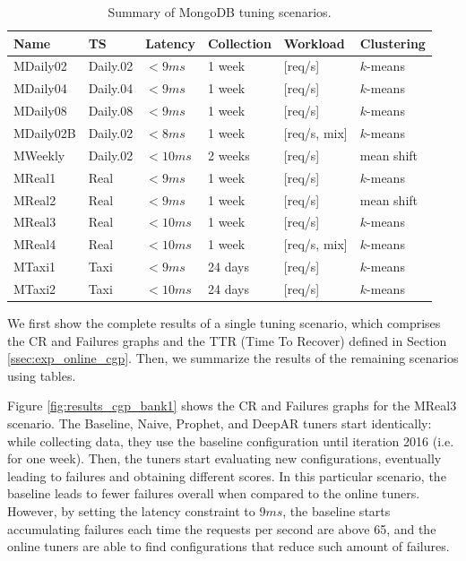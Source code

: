 \documentclass[a4paper, 12pt]{article} %
\newcommand{\ra}[1]{\renewcommand{\arraystretch}{#1}}
\begin{document}
	\begin{table}\centering 
		\ra{1.3}
		\begin{tabularx}{\textwidth}{@{}llllXX@{}}
			\midrule
			Name & TS & Latency & Collection & Workload & Clustering\\
			\midrule
			MDaily02&Daily.02 & $<9ms$  & 1 week & [req/s]  & $k$-means\\
			MDaily04&Daily.04 & $<9ms$  & 1 week & [req/s]  & $k$-means\\
			MDaily08&Daily.08 & $<9ms$  & 1 week & [req/s] & $k$-means\\
			MDaily02B&Daily.02 & $<8ms$  & 1 week & [req/s, mix] & $k$-means\\
			MWeekly&Daily.02 & $<10ms$  & 2 weeks & [req/s]  & mean shift\\
			MReal1&Real & $<9ms$  & 1 week & [req/s]  & $k$-means\\
			MReal2&Real & $<9ms$  & 1 week & [req/s]  & mean shift\\
			MReal3&Real & $<10ms$  & 1 week & [req/s]  & $k$-means\\
			MReal4&Real & $<10ms$  & 1 week & [req/s, mix]  & $k$-means\\
			MTaxi1 &Taxi & $<9ms$  & 24 days & [req/s]  & $k$-means\\
			MTaxi2 &Taxi & $<10ms$  & 24 days & [req/s]  & $k$-means\\
			
			\bottomrule
		\end{tabularx}
		\caption{Summary of MongoDB tuning scenarios. }  \label{table:results_tuning_scenarios}
	\end{table}
	
	We first show the complete results of a single tuning scenario, which comprises the CR and Failures graphs and the TTR (Time To Recover) defined in Section \ref{ssec:exp_online_cgp}. Then, we summarize the results of the remaining scenarios using tables.
	
	Figure \ref{fig:results_cgp_bank1} shows the CR and Failures graphs for the MReal3 scenario. The Baseline, Naive, Prophet, and DeepAR tuners start identically: while collecting data, they use the baseline configuration until iteration 2016 (i.e. for one week). Then, the tuners start evaluating new configurations, eventually leading to failures and obtaining different scores. In this particular scenario, the baseline leads to fewer failures overall when compared to the online tuners. However, by setting the latency constraint to $9ms$, the baseline starts accumulating failures each time the requests per second are above 65, and the online tuners are able to find configurations that reduce such amount of failures. 
	
\end{document}
